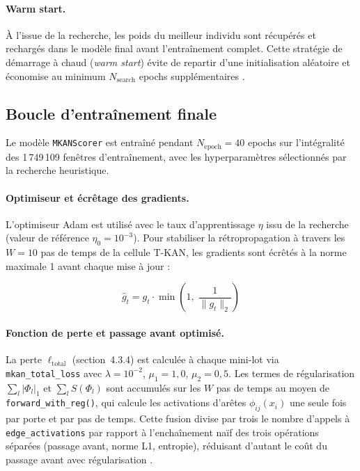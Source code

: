 \documentclass[11pt,a4paper,oneside]{report}
\theoremstyle{definition}
\theoremstyle{remark}
\begin{document}
\paragraph{Warm start.}
À l'issue de la recherche, les poids du meilleur individu sont récupérés et rechargés dans le modèle final avant l'entraînement complet. Cette stratégie de démarrage à chaud (\textit{warm start}) évite de repartir d'une initialisation aléatoire et économise au minimum $N_{\text{search}}$ epochs supplémentaires \citep{Zhu2025}.

\subsection{Boucle d'entraînement finale}
\label{subsec:training_loop}

Le modèle \texttt{MKANScorer} est entraîné pendant $N_{\text{epoch}} = 40$ epochs sur l'intégralité des 1\,749\,109 fenêtres d'entraînement, avec les hyperparamètres sélectionnés par la recherche heuristique.

\paragraph{Optimiseur et écrêtage des gradients.}
L'optimiseur Adam est utilisé avec le taux d'apprentissage $\eta$ issu de la recherche (valeur de référence $\eta_0 = 10^{-3}$). Pour stabiliser la rétropropagation à travers les $W = 10$ pas de temps de la cellule T-KAN, les gradients sont écrêtés à la norme maximale 1 avant chaque mise à jour :

\begin{equation}
    \hat{g}_t = g_t \cdot \min\!\left(1,\; \frac{1}{\lVert g_t \rVert_2}\right)
    \label{eq:clipgrad}
\end{equation}

\paragraph{Fonction de perte et passage avant optimisé.}
La perte $\ell_{\text{total}}$ (section~4.3.4) est calculée à chaque mini-lot via \texttt{mkan\_total\_loss} avec $\lambda = 10^{-2}$, $\mu_1 = 1{,}0$, $\mu_2 = 0{,}5$. Les termes de régularisation $\sum_l |\Phi_l|_1$ et $\sum_l S(\Phi_l)$ sont accumulés sur les $W$ pas de temps au moyen de \texttt{forward\_with\_reg()}, qui calcule les activations d'arêtes $\phi_{ij}(x_i)$ une seule fois par porte et par pas de temps. Cette fusion divise par trois le nombre d'appels à \texttt{edge\_activations} par rapport à l'enchaînement naïf des trois opérations séparées (passage avant, norme L1, entropie), réduisant d'autant le coût du passage avant avec régularisation \citep{liu2024kan}.
\end{document}
